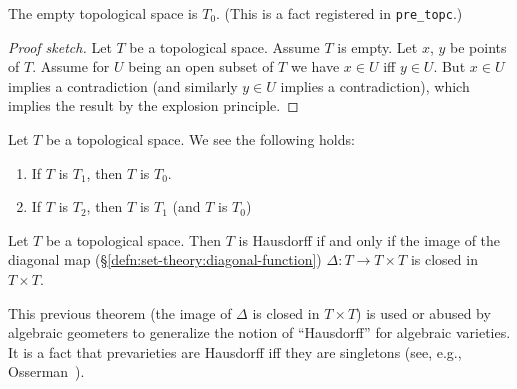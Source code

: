 \begin{example}
The empty topological space is $T_{0}$. (This is a fact registered in \texttt{pre\_topc}.)

\begin{proof}[Proof sketch]
Let $T$ be a topological space. Assume $T$ is empty.
Let $x$, $y$ be points of $T$. Assume for $U$ being an open subset of
$T$ we have $x\in U$ iff $y\in U$.
But $x\in U$ implies a contradiction (and similarly $y\in U$ implies a
contradiction), which implies the result by the explosion principle.
\end{proof}
\end{example}

\begin{theorem}
Let $T$ be a topological space. We see the following holds:
\begin{enumerate}
\item If $T$ is $T_{1}$, then $T$ is $T_{0}$.
\item If $T$ is $T_{2}$, then $T$ is $T_{1}$ (and $T$ is $T_{0}$)
\end{enumerate}
\end{theorem}

\begin{theorem}
Let $T$ be a topological space.
Then $T$ is Hausdorff if and only if the image of the diagonal map (\S\ref{defn:set-theory:diagonal-function}) $\Delta\colon T\to T\times T$
is closed in $T\times T$.
\end{theorem}

\begin{remark}
This previous theorem (the image of $\Delta$ is closed in $T\times T$)
is used or abused by algebraic geometers to generalize the notion of
``Hausdorff'' for algebraic varieties. It is a fact that prevarieties
are Hausdorff iff they are singletons (see, e.g.,
Osserman~\cite[ch.5]{osserman2021concise}). 
\end{remark}